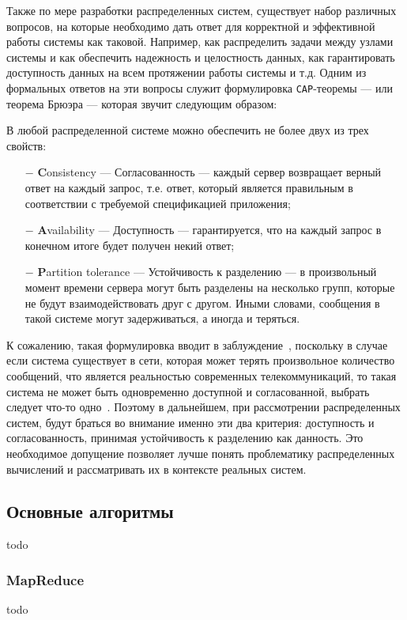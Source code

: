 Также по мере разработки распределенных систем, существует набор различных вопросов, на которые необходимо дать ответ для корректной и эффективной работы системы как таковой.
Например, как распределить задачи между узлами системы и как обеспечить надежность и целостность данных, 
как гарантировать доступность данных на всем протяжении работы системы и т.д.
Одним из формальных ответов на эти вопросы служит формулировка \texttt{CAP}-теоремы --- или теорема Брюэра --- которая звучит следующим образом: 

В любой распределенной системе можно обеспечить не более двух из трех свойств:
\begin{itemize}
  \item[$-$] \textbf{C}onsistency --- Согласованность --- каждый сервер возвращает верный ответ на каждый запрос, т.е. ответ, который является правильным в соответствии с требуемой спецификацией приложения;
  \item[$-$] \textbf{A}vailability --- Доступность --- гарантируется, что на каждый запрос в конечном итоге будет получен некий ответ;
  \item[$-$] \textbf{P}artition tolerance --- Устойчивость к разделению --- в произвольный момент времени сервера могут быть разделены на несколько групп, которые не будут взаимодействовать друг с другом. Иными словами, сообщения в такой системе могут задерживаться, а иногда и теряться.
\end{itemize}

К сожалению, такая формулировка вводит в заблуждение~\cite{cap-changed}, поскольку в случае если система существует в сети, которая может терять произвольное количество сообщений, что является реальностью современных телекоммуникаций, то такая система не может быть одновременно доступной и согласованной, выбрать следует что-то одно~\cite{cap-confusion}.
Поэтому в дальнейшем, при рассмотрении распределенных систем, будут браться во внимание именно эти два критерия: доступность и согласованность, принимая устойчивость к разделению как данность.
Это необходимое допущение позволяет лучше понять проблематику распределенных вычислений и рассматривать их в контексте реальных систем.

\subsection{Основные алгоритмы}
todo
\subsubsection{MapReduce}
todo
